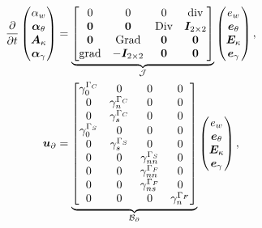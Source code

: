 \begin{equation}
\begin{aligned}
\displaystyle
\diffp{}{t}
\begin{pmatrix}
\alpha_w \\
\bm\alpha_\theta \\
\bm{A}_\kappa \\
\bm\alpha_{\gamma} \\
\end{pmatrix} &= 
\underbrace{\begin{bmatrix}
	0  & 0  & 0  & \div \\
	\bm{0} & \bm{0} &  \Div & \bm{I}_{2 \times 2}\\
	\bm{0}  & \Grad  & \bm{0}  & \bm{0}\\
	\grad & -\bm{I}_{2 \times 2} &  \bm{0} & \bm{0} \\
	\end{bmatrix}}_{\mathcal{J}}
\begin{pmatrix}
e_w \\
\bm{e}_{\theta} \\
\bm{E}_{\kappa} \\
\bm{e}_{\gamma} \\
\end{pmatrix}, \vspace{3pt}\\
\bm{u}_\partial &= \underbrace{
	\begin{bmatrix}
	\gamma_{0}^{\Gamma_C} & {0} & {0} & {0} \\
	{0} & \gamma_n^{\Gamma_C} &  {0} & {0} \\
	{0} & \gamma_s^{\Gamma_C} &  {0} & {0} \\
	\gamma_{0}^{\Gamma_S} & {0} & {0} & {0} \\
	{0} & \gamma_s^{\Gamma_S} & {0} & {0} \\
	{0} &  {0} & \gamma_{nn}^{\Gamma_S} & {0} \\
	{0} &  {0} & \gamma_{nn}^{\Gamma_F} & {0} \\
	{0} &  {0} & \gamma_{ns}^{\Gamma_F} & {0} \\
	{0} &  {0} & {0} & \gamma_{n}^{\Gamma_F} \\
	\end{bmatrix}}_{\mathcal{B}_\partial} \begin{pmatrix}
e_w \\
\bm{e}_{\theta} \\
\bm{E}_{\kappa} \\
\bm{e}_{\gamma} \\
\end{pmatrix}, \vspace{3pt}\qquad

\end{aligned}
\end{equation}
